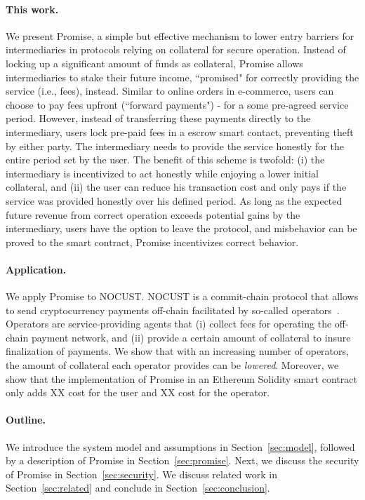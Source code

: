 \documentclass[runningheads]{llncs}
\newcommand{\sys}{Promise\xspace}
\begin{document}
\paragraph{This work.}
We present \sys, a simple but effective mechanism to lower entry barriers for intermediaries in protocols relying on collateral for secure operation.
Instead of locking up a significant amount of funds as collateral, \sys allows intermediaries to stake their future income, ``promised" for correctly providing the service (i.e., fees), instead.
Similar to online orders in e-commerce, users can choose to pay fees upfront (``forward payments") - for a some pre-agreed service period.
However, instead of transferring these payments directly to the intermediary, users lock pre-paid fees in a escrow smart contact, preventing theft by either party. 
The intermediary needs to provide the service honestly for the entire period set by the user.
The benefit of this scheme is twofold: (i) the intermediary is incentivized to act honestly while enjoying a lower initial collateral, and (ii) the user can reduce his transaction cost and only pays if the service was provided honestly over his defined period. %
As long as the expected future revenue from correct operation exceeds potential gains by the intermediary, users have the option to leave the protocol, and misbehavior can be proved to the smart contract, \sys incentivizes correct behavior.

\paragraph{Application.}
We apply \sys to NOCUST.
NOCUST is a commit-chain protocol that allows to send cryptocurrency payments off-chain facilitated by so-called operators~\cite{Khalil2019NOCUST}.
Operators are service-providing agents that (i) collect fees for operating the off-chain payment network, and (ii) provide a certain amount of collateral to insure finalization of payments.
We show that with an increasing number of operators, the amount of collateral each operator provides can be \emph{lowered}.
Moreover, we show that the implementation of \sys in an Ethereum Solidity smart contract only adds XX cost for the user and XX cost for the operator.

\paragraph{Outline.}
We introduce the system model and assumptions in Section~\ref{sec:model}, followed by a description of \sys in Section~\ref{sec:promise}.
Next, we discuss the security of \sys in Section~\ref{sec:security}. %
We discuss related work in Section~\ref{sec:related} and conclude in Section~\ref{sec:conclusion}.
\end{document}
